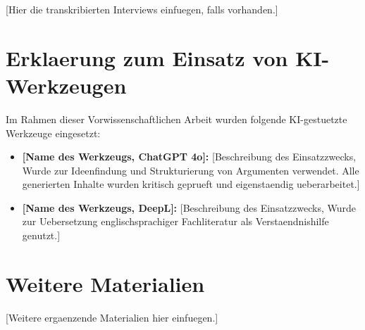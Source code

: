 [Hier die transkribierten Interviews einfuegen, falls vorhanden.]


\section{Erklaerung zum Einsatz von KI-Werkzeugen}
\label{sec:ki-erklaerung}


Im Rahmen dieser Vorwissenschaftlichen Arbeit wurden folgende
KI-gestuetzte Werkzeuge eingesetzt:

\begin{itemize}
  \item \textbf{[Name des Werkzeugs, \zB ChatGPT 4o]:}
    [Beschreibung des Einsatzzwecks, \zB \glqq Wurde zur Ideenfindung
    und Strukturierung von Argumenten verwendet. Alle generierten
    Inhalte wurden kritisch geprueft und eigenstaendig ueberarbeitet.\grqq]
  \item \textbf{[Name des Werkzeugs, \zB DeepL]:}
    [Beschreibung des Einsatzzwecks, \zB \glqq Wurde zur Uebersetzung
    englischsprachiger Fachliteratur als Verstaendnishilfe genutzt.\grqq]
\end{itemize}



\section{Weitere Materialien}
\label{sec:weitere-materialien}


[Weitere ergaenzende Materialien hier einfuegen.]
